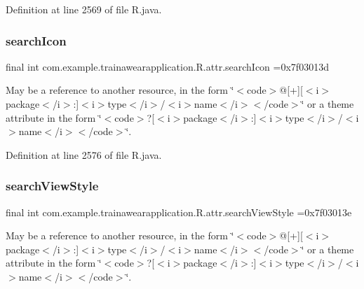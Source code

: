 Definition at line 2569 of file R.\+java.

\mbox{\label{classcom_1_1example_1_1trainawearapplication_1_1_r_1_1attr_ad089ba8a9c60f991fcac60162a9d1a8e}} 
\subsubsection{\texorpdfstring{searchIcon}{searchIcon}}
{\footnotesize\ttfamily final int com.\+example.\+trainawearapplication.\+R.\+attr.\+search\+Icon =0x7f03013d\hspace{0.3cm}{\ttfamily [static]}}

May be a reference to another resource, in the form \char`\"{}$<$code$>$@\mbox{[}+\mbox{]}\mbox{[}$<$i$>$package$<$/i$>$\+:\mbox{]}$<$i$>$type$<$/i$>$/$<$i$>$name$<$/i$>$$<$/code$>$\char`\"{} or a theme attribute in the form \char`\"{}$<$code$>$?\mbox{[}$<$i$>$package$<$/i$>$\+:\mbox{]}$<$i$>$type$<$/i$>$/$<$i$>$name$<$/i$>$$<$/code$>$\char`\"{}. 

Definition at line 2576 of file R.\+java.

\mbox{\label{classcom_1_1example_1_1trainawearapplication_1_1_r_1_1attr_a7a35c4fd6a280fc487a25c92428d07b3}} 
\subsubsection{\texorpdfstring{searchViewStyle}{searchViewStyle}}
{\footnotesize\ttfamily final int com.\+example.\+trainawearapplication.\+R.\+attr.\+search\+View\+Style =0x7f03013e\hspace{0.3cm}{\ttfamily [static]}}

May be a reference to another resource, in the form \char`\"{}$<$code$>$@\mbox{[}+\mbox{]}\mbox{[}$<$i$>$package$<$/i$>$\+:\mbox{]}$<$i$>$type$<$/i$>$/$<$i$>$name$<$/i$>$$<$/code$>$\char`\"{} or a theme attribute in the form \char`\"{}$<$code$>$?\mbox{[}$<$i$>$package$<$/i$>$\+:\mbox{]}$<$i$>$type$<$/i$>$/$<$i$>$name$<$/i$>$$<$/code$>$\char`\"{}. 

